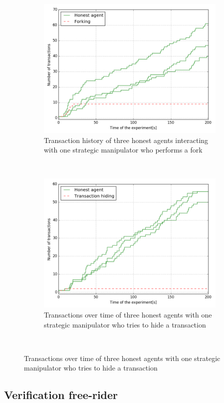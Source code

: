 \begin{figure}
    \begin{subfigure}{\textwidth}
      \centering
      \includegraphics[width=.6\linewidth]{images/forking}
      \caption{Transaction history of three honest agents interacting with one strategic manipulator who performs a fork}
      \label{fig:forking}
    \end{subfigure}\\
    \begin{subfigure}{\textwidth}
      \centering
      \includegraphics[width=.6\linewidth]{images/transaction_hiding}
      \caption{Transactions over time of three honest agents with one strategic manipulator who tries to hide a transaction}
      \label{fig:DFR_empty_exchanges}
    \end{subfigure}\\
\end{figure}

\subsection{Verification free-rider}

